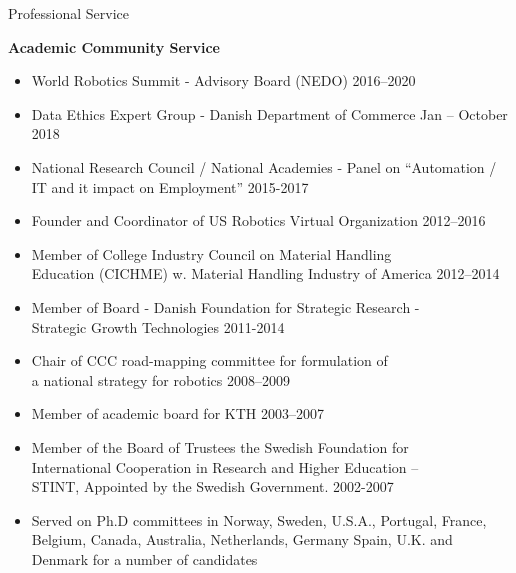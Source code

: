 \documentclass{article}
\begin{document}
\begin{cv}
\begin{cvlist}{Professional Service}%
\item {\bf Academic Community Service}
  \begin{itemize}
  \item World Robotics Summit - Advisory Board (NEDO)
    \cftdotfill{\cftdotsep} 2016--2020
  \item Data Ethics Expert Group - Danish Department of Commerce \cftdotfill{\cftdotsep}
    Jan -- October 2018
  \item National Research Council / National Academies - Panel on
    ``Automation / IT and it impact on Employment''
    \cftdotfill{\cftdotsep} 2015-2017
  \item Founder and Coordinator of US Robotics Virtual Organization
    \cftdotfill{\cftdotsep} 2012--2016
  \item Member of College Industry Council on Material Handling\\
    Education (CICHME) w. Material Handling Industry of America
    \cftdotfill{\cftdotsep} 2012--2014
  \item Member of Board - Danish Foundation for Strategic Research -\\
    Strategic Growth Technologies \cftdotfill{\cftdotsep} 2011-2014
  \item Chair of CCC road-mapping committee for formulation of \\
    a national strategy for robotics \cftdotfill{\cftdotsep}
    2008--2009
  \item Member of academic board for KTH \cftdotfill{\cftdotsep}
    2003--2007
  \item Member of the Board of Trustees the Swedish Foundation for\\
    International Cooperation in Research and Higher Education --\\
    STINT, Appointed by the Swedish Government.
    \cftdotfill{\cftdotsep} 2002-2007
  \item Served on Ph.D committees in Norway, Sweden, U.S.A., Portugal,
    France, Belgium, Canada, Australia, Netherlands, Germany Spain,
    U.K. and Denmark for a number of candidates
  \end{itemize}


\end{cvlist}
\end{cv}
\end{document}
